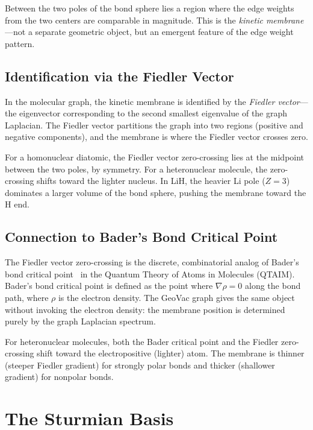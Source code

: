 \documentclass[aps,pra,twocolumn,superscriptaddress,longbibliography]{revtex4-2}
\begin{document}
Between the two poles of the bond sphere lies a region where the edge
weights from the two centers are comparable in magnitude.  This is the
\emph{kinetic membrane}---not a separate geometric object, but an
emergent feature of the edge weight pattern.

\subsection{Identification via the Fiedler Vector}

In the molecular graph, the kinetic membrane is identified by the
\emph{Fiedler vector}---the eigenvector corresponding to the second
smallest eigenvalue of the graph Laplacian.  The Fiedler vector
partitions the graph into two regions (positive and negative components),
and the membrane is where the Fiedler vector crosses zero.

For a homonuclear diatomic, the Fiedler vector zero-crossing lies at
the midpoint between the two poles, by symmetry.  For a heteronuclear
molecule, the zero-crossing shifts toward the lighter nucleus.  In LiH,
the heavier Li pole ($Z = 3$) dominates a larger volume of the bond
sphere, pushing the membrane toward the H end.

\subsection{Connection to Bader's Bond Critical Point}

The Fiedler vector zero-crossing is the discrete, combinatorial analog
of Bader's bond critical point~\cite{Bader1990} in the Quantum Theory
of Atoms in Molecules (QTAIM).  Bader's bond critical point is defined
as the point where $\nabla\rho = 0$ along the bond path, where $\rho$
is the electron density.  The GeoVac graph gives the same object
without invoking the electron density: the membrane position is
determined purely by the graph Laplacian spectrum.

For heteronuclear molecules, both the Bader critical point and the
Fiedler zero-crossing shift toward the electropositive (lighter) atom.
The membrane is thinner (steeper Fiedler gradient) for strongly polar
bonds and thicker (shallower gradient) for nonpolar bonds.


\section{The Sturmian Basis}
\label{sec:sturmian}
\end{document}
